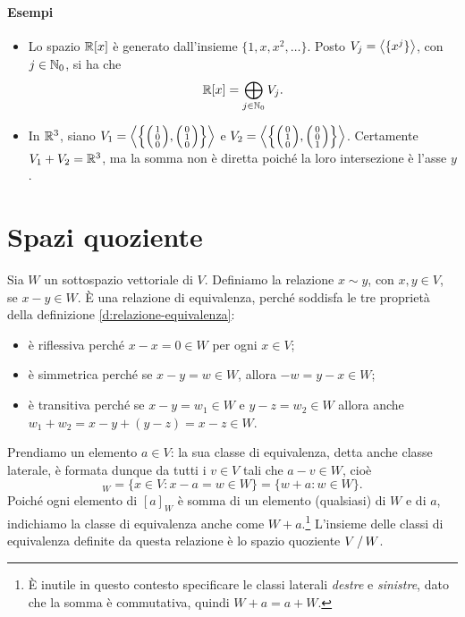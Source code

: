 \paragraph{Esempi}
\begin{itemize}
	\item Lo spazio $\mathbb{R}[x]$ è generato dall'insieme $\{1,x,x^2,\dots\}$.
		Posto $V_j=\left\langle{\{x^j\}}\right\rangle$, con $j\in\mathbb{N}_0$, si ha che
		\begin{equation*}
			\mathbb{R}[x]=\bigoplus_{j\in\mathbb{N}_0}V_j.
		\end{equation*}
	\item In $\mathbb{R}^3$, siano $V_1=\left\langle{\Big\{\begin{psmallmatrix}1\\0\\0\end{psmallmatrix},\begin{psmallmatrix}0\\1\\0\end{psmallmatrix}\Big\}}\right\rangle$ e $V_2=\left\langle{\Big\{\begin{psmallmatrix}0\\1\\0\end{psmallmatrix},\begin{psmallmatrix}0\\0\\1\end{psmallmatrix}\Big\}}\right\rangle$.
		Certamente $V_1+V_2=\mathbb{R}^3$, ma la somma non è diretta poiché la loro intersezione è l'asse $y$.
\end{itemize}

\section{Spazi quoziente} \label{sec:spazi_quoziente}
Sia $W$ un sottospazio vettoriale di $V$.
Definiamo la relazione $x\sim y$, con $x,y\in V$, se $x-y\in W$.
È una relazione di equivalenza, perché soddisfa le tre proprietà della definizione \ref{d:relazione-equivalenza}:
\begin{itemize}
	\item è riflessiva perch\'e $x-x=0\in W$ per ogni $x\in V$;
	\item è simmetrica perch\'e se $x-y=w\in W$, allora $-w=y-x\in W$;
	\item è transitiva perch\'e se $x-y=w_1\in W$ e $y-z=w_2\in W$ allora anche $w_1+w_2=x-y+(y-z)=x-z\in W$.
\end{itemize}
Prendiamo un elemento $a\in V$: la sua classe di equivalenza, detta anche classe laterale, è formata dunque da tutti i $v\in V$ tali che $a-v\in W$, cioè
\begin{equation*}
	[a]_W=\{x\in V\colon x-a=w\in W\}=\{w+a\colon w\in W\}.
\end{equation*}
Poich\'e ogni elemento di $[a]_W$ è somma di un elemento (qualsiasi) di $W$ e di $a$, indichiamo la classe di equivalenza anche come $W+a$.\footnote{È inutile in questo contesto specificare le classi laterali \emph{destre} e \emph{sinistre}, dato che la somma è commutativa, quindi $W+a=a+W$.}
L'insieme delle classi di equivalenza definite da questa relazione è lo spazio quoziente $V\,/\, W$.

